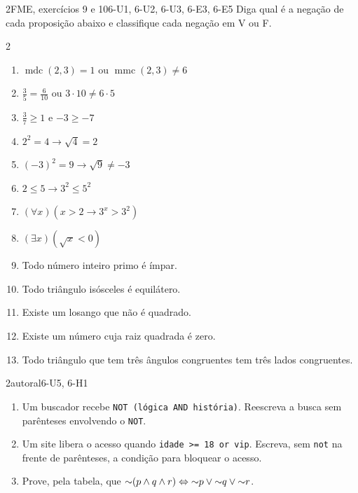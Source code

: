 \begin{questao}{2}{FME, exercícios 9 e 10}{6-U1, 6-U2, 6-U3, 6-E3, 6-E5}\label{u6:q8}
Diga qual é a negação de cada proposição abaixo e classifique cada negação em V ou F.
\begin{multicols}{2}
\begin{enumerate}[label=\alph*)]
  \item $\operatorname{mdc}(2,3)=1$ ou $\operatorname{mmc}(2,3)\neq6$
  \item $\frac35=\frac6{10}$ ou $3\cdot10\neq6\cdot5$
  \item $\frac37\ge1$ e $-3\ge-7$
  \item $2^2=4\rightarrow\sqrt4=2$
  \item $(-3)^2=9\rightarrow\sqrt9\neq-3$
  \item $2\le5\rightarrow3^2\le5^2$
  \item $(\forall x)(x>2\rightarrow3^x>3^2)$
  \item $(\exists x)(\sqrt x<0)$
  \item Todo número inteiro primo é ímpar.
  \item Todo triângulo isósceles é equilátero.
  \item Existe um losango que não é quadrado.
  \item Existe um número cuja raiz quadrada é zero.
  \item Todo triângulo que tem três ângulos congruentes tem três lados congruentes.
\end{enumerate}
\end{multicols}
\end{questao}

\begin{questao}{2}{autoral}{6-U5, 6-H1}\label{u6:q9}
\begin{enumerate}[label=\alph*)]
  \item Um buscador recebe \texttt{NOT (lógica AND história)}. Reescreva a busca sem parênteses envolvendo o \texttt{NOT}.
  \item Um site libera o acesso quando \texttt{idade >= 18 or vip}. Escreva, sem \texttt{not} na frente de parênteses, a condição para bloquear o acesso.
  \item Prove, pela tabela, que ${{\sim}}(p\wedge q\wedge r)\Leftrightarrow{{\sim}}p\vee{{\sim}}q\vee{{\sim}}r$.
\end{enumerate}
\end{questao}

